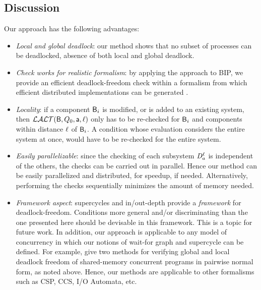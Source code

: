 


\subsection{Discussion}
Our approach has the following advantages:
\begin{itemize}

\item \emph{Local and global deadlock}: our method shows that no subset of processes
  can be deadlocked, \ie absence of both local and global deadlock. 

\item \emph{Check works for realistic formalism}:  by applying the approach to BIP, we
provide an efficient deadlock-freedom check within a formalism from
which efficient distributed implementations can be generated
\cite{BonakdarpourBJQS10b}.  

\item \emph{Locality}: if a component $\mathsf{B}_i$ is modified, or is added to an
  existing system, then $\mathcal{LALT}(\mathsf{B}, Q_0, \mathsf{a}, \ell)$ only has to
  be re-checked for $\mathsf{B}_i$ and components within distance $\ell$ of $\mathsf{B}_i$.
  A condition whose evaluation considers the entire
  system at once, \eg \cite{AB03,DFinder2,GS03}
  would have to be re-checked for the entire system. 

\item \emph{Easily parallelizable}: since the checking of each subsystem $\mathit{D}_{a}^{\ell}$
  is independent of the others, the checks can be carried out in parallel. Hence
  our method can be easily parallelized and distributed, for speedup, if needed.
  Alternatively, performing the checks sequentially
  minimizes the amount of memory needed. 

\item \emph{Framework aspect}: supercycles and in/out-depth provide a \emph{framework} for
  deadlock-freedom. Conditions more general and/or discriminating than
  the one presented here 
  should be devisable in this framework. This is a topic for future work.
In addition, our approach is applicable to any model of concurrency in
which our notions of wait-for graph and supercycle can be defined. For example,  
give two methods for verifying global
and local deadlock freedom of shared-memory concurrent programs in pairwise normal form, as noted above.
Hence, our methods are applicable to other formalisms such as CSP, CCS, I/O Automata, etc.


\end{itemize}


